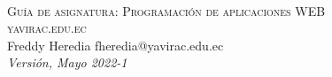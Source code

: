 \newpage
~\vfill
\thispagestyle{empty}

\noindent \textsc{Guía de asignatura: Programación de aplicaciones WEB}\\

\noindent \textsc{yavirac.edu.ec}\\ 

\noindent Freddy Heredia fheredia@yavirac.edu.ec \\ %


\noindent \textit{Versión, Mayo 2022-1} %
